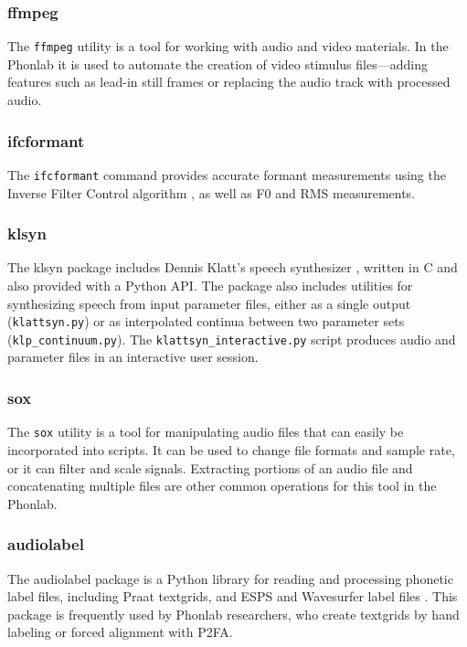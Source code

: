 \documentclass[a4paper]{article}
\begin{document}
      \subsubsection{ffmpeg}
      The {\tt ffmpeg} utility \cite{ffmpeg} is a tool for working with audio and video materials. In the Phonlab it is used to automate the creation of video stimulus files---adding features such as lead-in still frames or replacing the audio track with processed audio.
      
      \subsubsection{ifcformant}
      The {\tt ifcformant} command provides accurate formant measurements using the Inverse Filter Control algorithm \cite{ifcformant}, as well as F0 and RMS measurements.

      \subsubsection{klsyn}
      The klsyn package \cite{klsyn-GIT} includes Dennis Klatt's speech synthesizer \cite{Klatt-80}, written in C and also provided with a Python API. The package also includes utilities for synthesizing speech from input parameter files, either as a single output ({\tt klattsyn.py}) or as interpolated continua between two parameter sets ({\tt klp\_continuum.py}). The {\tt klattsyn\_interactive.py} script produces audio and parameter files in an interactive user session.

      \subsubsection{sox}
      The {\tt sox} utility \cite{sox} is a tool for manipulating audio files that can easily be incorporated into scripts. It can be used to change file formats and sample rate, or it can filter and scale signals. Extracting portions of an audio file and concatenating multiple files are other common operations for this tool in the Phonlab.

      \subsubsection{audiolabel}
      The audiolabel package is a Python library for reading and processing phonetic label files, including Praat textgrids, and ESPS and Wavesurfer label files \cite{audiolabel-GIT}. This package is frequently used by Phonlab researchers, who create textgrids by hand labeling or forced alignment with P2FA.
\end{document}
